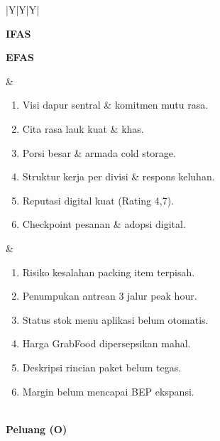 \begin{xltabular}{\textwidth}{|Y|Y|Y|}
        \midrule
        \endfirsthead
        \toprule
        \begin{minipage}[t][5.15cm][t]{\linewidth}
        \hfill\textbf{IFAS}\par
        \vfill
        \textbf{EFAS}\hfill{}%
        \end{minipage}
         &
        \begin{enumerate}[label=\textbf{S\arabic*.},leftmargin=1.5em,nosep,itemsep=0pt,topsep=1pt,parsep=0pt,partopsep=0pt]
            \item Visi dapur sentral \& komitmen mutu rasa.
            \item Cita rasa lauk kuat \& khas.
            \item Porsi besar \& armada cold storage.
            \item Struktur kerja per divisi \& respons keluhan.
            \item Reputasi digital kuat (Rating 4,7).
            \item Checkpoint pesanan \& adopsi digital.
        \end{enumerate} &
        \begin{enumerate}[label=\textbf{W\arabic*.},leftmargin=1.5em,nosep,itemsep=0pt,topsep=1pt,parsep=0pt,partopsep=0pt]
            \item Risiko kesalahan packing item terpisah.
            \item Penumpukan antrean 3 jalur peak hour.
            \item Status stok menu aplikasi belum otomatis.
            \item Harga GrabFood dipersepsikan mahal.
            \item Deskripsi rincian paket belum tegas.
            \item Margin belum mencapai BEP ekspansi.
        \end{enumerate} \\ \hline
        \midrule
        \endhead
        \endfoot
        \bottomrule
        \endlastfoot
        \textbf{Peluang (O)}
        \begin{enumerate}[label=\textbf{O\arabic*.},leftmargin=1.5em,nosep,itemsep=0pt,topsep=1pt,parsep=0pt,partopsep=0pt]

\end{enumerate}
\end{xltabular}
